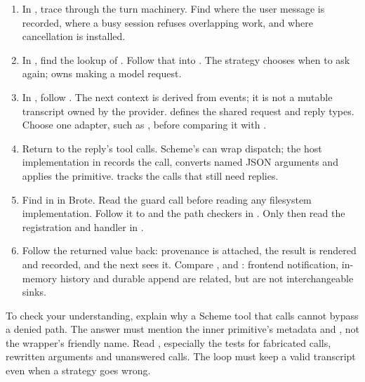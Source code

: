 \begin{enumerate}
\item In , trace  through the
  turn machinery. Find where the user message is recorded, where a busy
  session refuses overlapping work, and where cancellation is installed.
\item In , find the lookup of
  . Follow that into
  . The strategy chooses when to ask again;
   owns making a model request.
\item In , follow . The next
  context is derived from events; it is not a mutable transcript owned by
  the provider.  defines the shared request and
  reply types. Choose one adapter, such as ,
  before comparing it with .
\item Return to the reply's tool calls. Scheme's  can
  wrap dispatch; the host implementation in 
  records the call, converts named JSON arguments and applies the primitive.
   tracks the calls that still need replies.
\item Find  in  in Brote. Read the
  guard call before reading any filesystem implementation. Follow it to
   and the path checkers in
  . Only then read the 
  registration and handler in .
\item Follow the returned value back: provenance is attached, the result
  is rendered and recorded, and the next  sees it. Compare
  ,  and
  : frontend notification, in-memory history and
  durable append are related, but are not interchangeable sinks.
\end{enumerate}

To check your understanding, explain why a Scheme tool that calls
 cannot bypass a denied path. The answer must mention the
inner primitive's metadata and , not the wrapper's friendly
name. Read , especially the tests
for fabricated calls, rewritten arguments and unanswered calls. The loop
must keep a valid transcript even when a strategy goes wrong.

